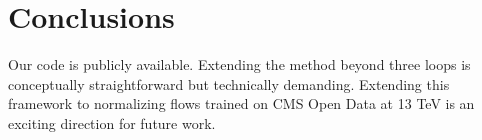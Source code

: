 \section{Conclusions}\label{sec:conclusions}

Our code is publicly available. Extending the method beyond three loops
is conceptually straightforward but technically demanding. Extending
this framework to normalizing flows trained on CMS Open Data at 13 TeV
is an exciting direction for future work.

